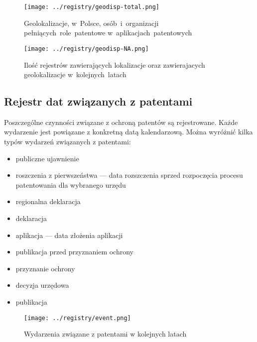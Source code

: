 \begin{figure}[H]\centering
\texttt{[image: ../registry/geodisp-total.png]}
\caption{Geolokalizacje,
         w~Polsce,
         osób~i~organizacji 
         pełniących~role~patentowe 
         w~aplikacjach~patentowych}
\label{fig:geodisp.png}
\end{figure}

\begin{figure}[H]\centering
\texttt{[image: ../registry/geodisp-NA.png]}
\caption{Ilość rejestrów  
         zawierających lokalizacje oraz
         zawierajacych geolokalizacje
         w~kolejnych~latach}
\label{fig:geodisp.png}
\end{figure}



\subsection{Rejestr dat związanych z patentami}

Poszczególne czynności związane z ochroną patentów są rejestrowane.
Każde wydarzenie jest powiązane z konkretną datą kalendarzową.
Można wyróżnić kilka typów wydarzeń związanych z patentami:

\begin{itemize}
\item publiczne ujawnienie 
\item roszczenia z pierwszeństwa  --- 
      data rozszczenia sprzed rozpoczęcia procesu patentowania dla wybranego urzędu
\item regionalna deklaracja 
\item deklaracja 
\item aplikacja  --- data złożenia aplikacji
\item publikacja przed przyznaniem ochrony 
\item przyznanie ochrony 
\item decyzja urzędowa
\item publikacja
\end{itemize}

\begin{figure}[H]\centering
\texttt{[image: ../registry/event.png]}
\caption{Wydarzenia związane z patentami w kolejnych latach}
\label{fig:geodisp.png}
\end{figure}

